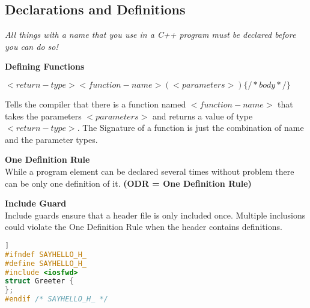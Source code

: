 \subsection{Declarations and Definitions}
\textit{All things with a name that you use in a C++ program must be declared before you can do so!}

\textbf{Defining Functions}
\begin{center}
	$<return-type> <function-name> (<parameters>) \{ /* body */ \}$
\end{center}
 Tells the compiler that there is a function named $<function-name>$ that takes the parameters $<parameters>$ and returns a value of type $<return-type>$. The Signature of a function is just the combination of name and the parameter types. 
 
\textbf{One Definition Rule}\\ 
 While a program element can be declared several times without problem there can be only one definition of it. \textbf{(ODR = One Definition Rule)}
 
\textbf{Include Guard}\\
Include guards ensure that a header file is only included once. Multiple inclusions could violate the One Definition Rule when the header contains definitions.
\begin{lstlisting}[language=C++]]
#ifndef SAYHELLO_H_
#define SAYHELLO_H_
#include <iosfwd>
struct Greeter {
};
#endif /* SAYHELLO_H_ */ 
\end{lstlisting}